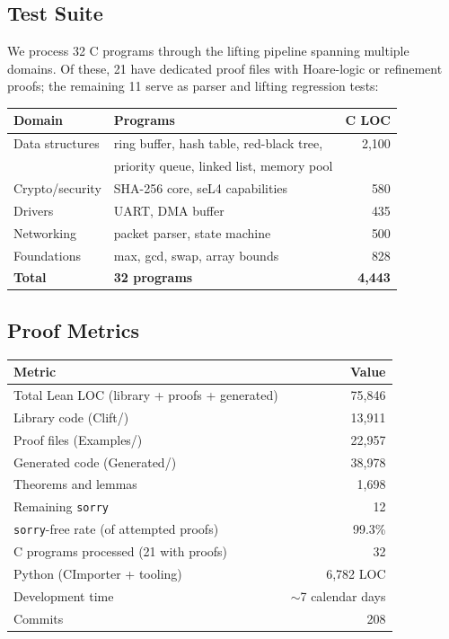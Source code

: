 \documentclass[sigconf,nonacm,screen]{acmart}
\begin{document}
\subsection{Test Suite}

We process 32 C programs through the lifting pipeline spanning
multiple domains. Of these, 21 have dedicated proof files with
Hoare-logic or refinement proofs; the remaining 11 serve as
parser and lifting regression tests:

\begin{center}
\small
\begin{tabular}{@{}llr@{}}
\toprule
\textbf{Domain} & \textbf{Programs} & \textbf{C LOC} \\
\midrule
Data structures  & ring buffer, hash table, red-black tree, & 2,100 \\
                 & priority queue, linked list, memory pool & \\
Crypto/security  & SHA-256 core, seL4 capabilities          & 580 \\
Drivers          & UART, DMA buffer                         & 435 \\
Networking       & packet parser, state machine              & 500 \\
Foundations      & max, gcd, swap, array bounds              & 828 \\
\midrule
\textbf{Total}   & \textbf{32 programs}                     & \textbf{4,443} \\
\bottomrule
\end{tabular}
\end{center}

\subsection{Proof Metrics}

\begin{center}
\small
\begin{tabular}{@{}lr@{}}
\toprule
\textbf{Metric} & \textbf{Value} \\
\midrule
Total Lean LOC (library + proofs + generated) & 75,846 \\
Library code (Clift/) & 13,911 \\
Proof files (Examples/) & 22,957 \\
Generated code (Generated/) & 38,978 \\
Theorems and lemmas & 1,698 \\
Remaining \texttt{sorry} & 12 \\
\texttt{sorry}-free rate (of attempted proofs) & 99.3\% \\
C programs processed (21 with proofs) & 32 \\
Python (CImporter + tooling) & 6,782 LOC \\
Development time & $\sim$7 calendar days \\
Commits & 208 \\
\bottomrule
\end{tabular}
\end{center}
\end{document}
